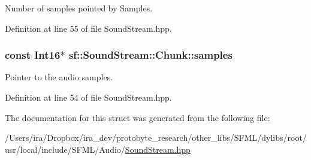 Number of samples pointed by Samples. 



Definition at line 55 of file Sound\-Stream.\-hpp.

\hypertarget{structsf_1_1_sound_stream_1_1_chunk_aa3b84d69adbe663a17a7671626076df4}{
\subsubsection[{samples}]{\setlength{\rightskip}{0pt plus 5cm}const {\bf Int16}$\ast$ sf\-::\-Sound\-Stream\-::\-Chunk\-::samples}}\label{structsf_1_1_sound_stream_1_1_chunk_aa3b84d69adbe663a17a7671626076df4}


Pointer to the audio samples. 



Definition at line 54 of file Sound\-Stream.\-hpp.



The documentation for this struct was generated from the following file\-:\begin{DoxyCompactItemize}
\item 
/\-Users/ira/\-Dropbox/ira\-\_\-dev/protobyte\-\_\-research/other\-\_\-libs/\-S\-F\-M\-L/dylibs/root/usr/local/include/\-S\-F\-M\-L/\-Audio/\hyperlink{_sound_stream_8hpp}{Sound\-Stream.\-hpp}\end{DoxyCompactItemize}
